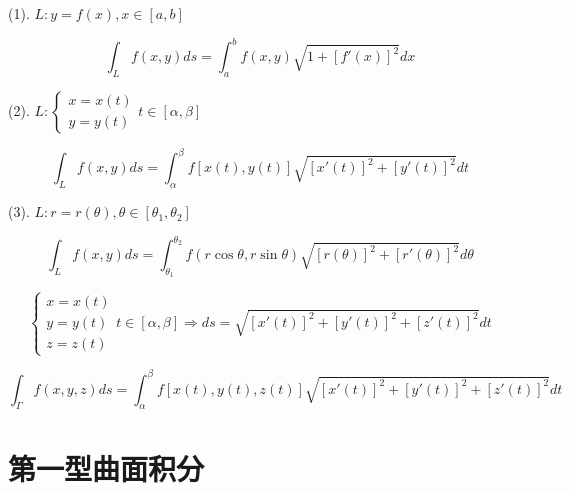 \begin{theorem}[平面曲线]
	
	(1). $L: y=f(x), x\in[a,b]$
	
	$$\int_{L}f(x,y)ds=\int_{a}^{b}f(x,y)\sqrt{1+[f'(x)]^2}dx$$
	
	(2). $L: \begin{cases}
		x = x(t)\\
		y = y(t)
	\end{cases} t\in[\alpha,\beta]$
	
	$$\int_{L}f(x,y)ds=\int_{\alpha}^{\beta}f\left[x(t),y(t)\right]\sqrt{[x'(t)]^2+[y'(t)]^2}dt$$
	
	(3). $L: r=r(\theta), \theta\in[\theta_{1},\theta_{2}]$
	
	$$\int_{L}f(x,y)ds=\int_{\theta_{1}}^{\theta_{2}}f(r\cos \theta,r\sin\theta)\sqrt{[r(\theta)]^2+[r'(\theta)]^2}d\theta$$
\end{theorem}
\begin{theorem}[空间曲线]
	
	$$\begin{cases}
		x = x(t)\\
		y = y(t)\\
		z = z(t)
	\end{cases} t\in[\alpha,\beta]\Rightarrow 
	ds=\sqrt{[x'(t)]^{2}+[y'(t)]^{2}+[z'(t)]^{2}}dt$$
	
	$$\int_{\Gamma}f(x,y,z)ds=\int_{\alpha}^{\beta}f \left[ x(t),y(t),z(t)\right]\sqrt{[x'(t)]^{2}+[y'(t)]^{2}+[z'(t)]^{2}}dt$$
\end{theorem}

\section{第一型曲面积分}
